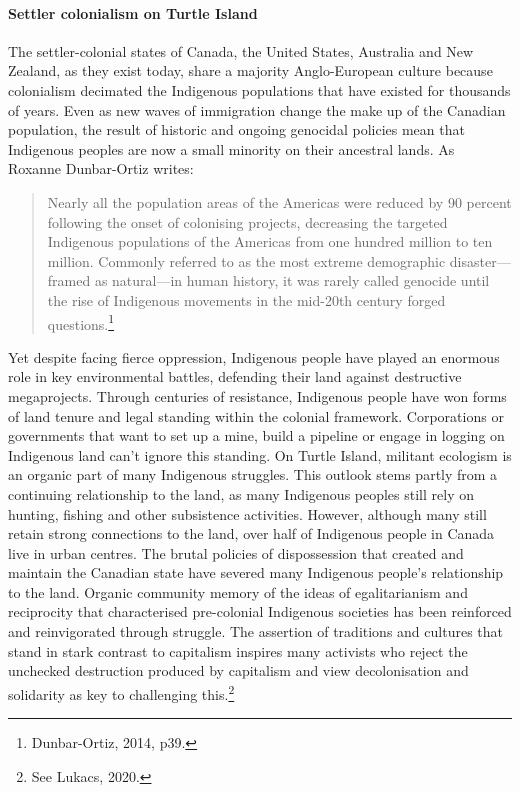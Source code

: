 \paragraph{Settler colonialism on Turtle Island}

The settler-colonial states of Canada, the United States, Australia and New Zealand, as they exist today, share a majority Anglo-European culture because colonialism decimated the Indigenous populations that have existed for thousands of years. Even as new waves of immigration change the make up of the Canadian population, the result of historic and ongoing genocidal policies mean that Indigenous peoples are now a small minority on their ancestral lands. As Roxanne Dunbar-Ortiz writes:

\blockquote{Nearly all the population areas of the Americas were reduced by 90 percent following the onset of colonising projects, decreasing the targeted Indigenous populations of the Americas from one hundred million to ten million. Commonly referred to as the most extreme demographic disaster---framed as natural---in human history, it was rarely called genocide until the rise of Indigenous movements in the mid-20th century forged questions.\footnote{Dunbar-Ortiz, 2014, p39.}}

Yet despite facing fierce oppression, Indigenous people have played an enormous role in key environmental battles, defending their land against destructive megaprojects. Through centuries of resistance, Indigenous people have won forms of land tenure and legal standing within the colonial framework. Corporations or governments that want to set up a mine, build a pipeline or engage in logging on Indigenous land can't ignore this standing. On Turtle Island, militant ecologism is an organic part of many Indigenous struggles. This outlook stems partly from a continuing relationship to the land, as many Indigenous peoples still rely on hunting, fishing and other subsistence activities. However, although many still retain strong connections to the land, over half of Indigenous people in Canada live in urban centres. The brutal policies of dispossession that created and maintain the Canadian state have severed many Indigenous people's relationship to the land. Organic community memory of the ideas of egalitarianism and reciprocity that characterised pre-colonial Indigenous societies has been reinforced and reinvigorated through struggle. The assertion of traditions and cultures that stand in stark contrast to capitalism inspires many activists who reject the unchecked destruction produced by capitalism and view decolonisation and solidarity as key to challenging this.\footnote{See Lukacs, 2020.}

